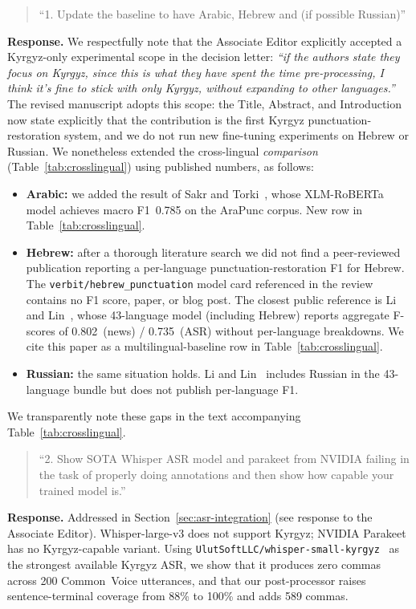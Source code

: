 \documentclass[manuscript, review]{acmart}
\begin{document}
\begin{quote}
``1. Update the baseline to have Arabic, Hebrew and (if possible Russian)''
\end{quote}

\noindent\textbf{Response.} We respectfully note that the Associate Editor explicitly accepted a Kyrgyz-only experimental scope in the decision letter: \emph{``if the authors state they focus on Kyrgyz, since this is what they have spent the time pre-processing, I think it's fine to stick with only Kyrgyz, without expanding to other languages.''} The revised manuscript adopts this scope: the Title, Abstract, and Introduction now state explicitly that the contribution is the first Kyrgyz punctuation-restoration system, and we do not run new fine-tuning experiments on Hebrew or Russian. We nonetheless extended the cross-lingual \emph{comparison} (Table~\ref{tab:crosslingual}) using published numbers, as follows:
\begin{itemize}
\item \textbf{Arabic:} we added the result of Sakr and Torki~\cite{sakr2023arapunc}, whose XLM-RoBERTa model achieves macro F1~0.785 on the AraPunc corpus. New row in Table~\ref{tab:crosslingual}.
\item \textbf{Hebrew:} after a thorough literature search we did not find a peer-reviewed publication reporting a per-language punctuation-restoration F1 for Hebrew. The \texttt{verbit/hebrew\_punctuation} model card referenced in the review contains no F1 score, paper, or blog post. The closest public reference is Li and Lin~\cite{li2020multilingual}, whose 43-language model (including Hebrew) reports aggregate F-scores of 0.802~(news) / 0.735~(ASR) without per-language breakdowns. We cite this paper as a multilingual-baseline row in Table~\ref{tab:crosslingual}.
\item \textbf{Russian:} the same situation holds. Li and Lin~\cite{li2020multilingual} includes Russian in the 43-language bundle but does not publish per-language F1.
\end{itemize}
We transparently note these gaps in the text accompanying Table~\ref{tab:crosslingual}.

\begin{quote}
``2. Show SOTA Whisper ASR model and parakeet from NVIDIA failing in the task of properly doing annotations and then show how capable your trained model is.''
\end{quote}

\noindent\textbf{Response.} Addressed in Section~\ref{sec:asr-integration} (see response to the Associate Editor). Whisper-large-v3 does not support Kyrgyz; NVIDIA Parakeet has no Kyrgyz-capable variant. Using \texttt{UlutSoftLLC/whisper-small-kyrgyz}~\cite{ulutsoft2024whisper} as the strongest available Kyrgyz ASR, we show that it produces zero commas across 200 Common~Voice utterances, and that our post-processor raises sentence-terminal coverage from 88\% to 100\% and adds 589 commas.
\end{document}
